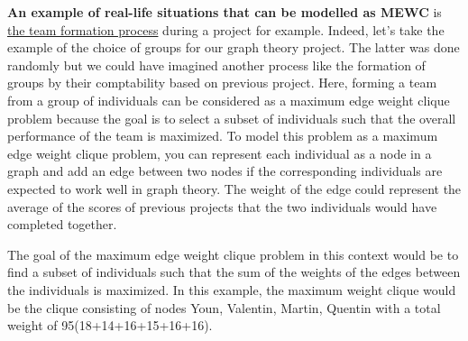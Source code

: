 \documentclass{article}
\begin{document}
\begin{flushleft}

    \textbf{An example of real-life situations that can be modelled as MEWC} is \underline{the team formation process} during a project for example. 
    \newline \newline
    Indeed, let's take the example of the choice of groups for our graph theory project. The latter was done randomly but we could have imagined another process like the formation of groups by their comptability based on previous project. Here, forming a team from a group of individuals can be considered as a maximum edge weight clique problem because the goal is to select a subset of individuals such that the overall performance of the team is maximized.
    \newline \newline
    To model this problem as a maximum edge weight clique problem, you can represent each individual as a node in a graph and add an edge between two nodes if the corresponding individuals are expected to work well in graph theory. The weight of the edge could represent the average of the scores of previous projects that the two individuals would have completed together.

    \begin{center}
    \end{center}
    
    The goal of the maximum edge weight clique problem in this context would be to find a subset of individuals such that the sum of the weights of the edges between the individuals is maximized. In this example, the maximum weight clique would be the clique consisting of nodes Youn, Valentin, Martin, Quentin with a total weight of 95(18+14+16+15+16+16).

\end{flushleft}
\end{document}

